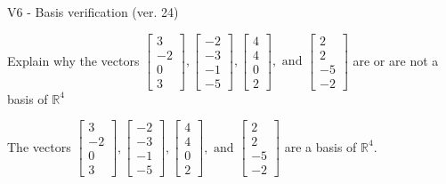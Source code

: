 \begin{exercise}
  \begin{exerciseTitle}V6 - Basis verification (ver. 24)\end{exerciseTitle}
  \begin{exerciseStatement}
    Explain why the vectors \(\left[\begin{array}{r}
3 \\
-2 \\
0 \\
3
\end{array}\right] , \left[\begin{array}{r}
-2 \\
-3 \\
-1 \\
-5
\end{array}\right] , \left[\begin{array}{r}
4 \\
4 \\
0 \\
2
\end{array}\right] , \text{ and } \left[\begin{array}{r}
2 \\
2 \\
-5 \\
-2
\end{array}\right]\) are or are not a basis of \(\mathbb{R}^4\)	


  \end{exerciseStatement}
  \begin{exerciseAnswer}
   The vectors \(\left[\begin{array}{r}
3 \\
-2 \\
0 \\
3
\end{array}\right] , \left[\begin{array}{r}
-2 \\
-3 \\
-1 \\
-5
\end{array}\right] , \left[\begin{array}{r}
4 \\
4 \\
0 \\
2
\end{array}\right] , \text{ and } \left[\begin{array}{r}
2 \\
2 \\
-5 \\
-2
\end{array}\right]\) 
  	 are  a basis of \(\mathbb{R}^4\).
  


  \end{exerciseAnswer}
\end{exercise}